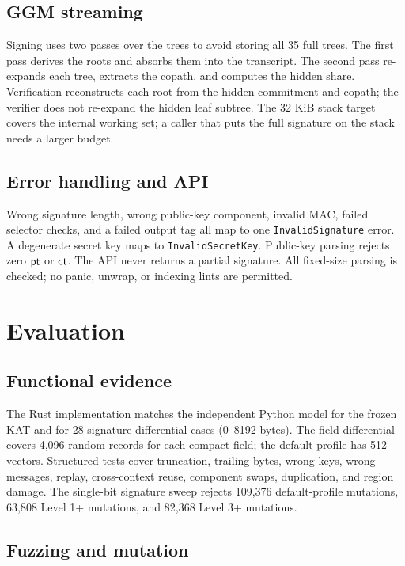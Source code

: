 \documentclass[11pt,a4paper]{article}
\begin{document}
\subsection{GGM streaming}

Signing uses two passes over the trees to avoid storing all 35 full trees. The
first pass derives the roots and absorbs them into the transcript. The second
pass re-expands each tree, extracts the copath, and computes the hidden share.
Verification reconstructs each root from the hidden commitment and copath; the
verifier does not re-expand the hidden leaf subtree. The 32 KiB stack target
covers the internal working set; a caller that puts the full signature on the
stack needs a larger budget.

\subsection{Error handling and API}

Wrong signature length, wrong public-key component, invalid MAC, failed
selector checks, and a failed output tag all map to one \texttt{InvalidSignature}
error. A degenerate secret key maps to \texttt{InvalidSecretKey}. Public-key
parsing rejects zero $\mathsf{pt}$ or $\mathsf{ct}$. The API never returns a partial
signature. All fixed-size parsing is checked; no panic, unwrap, or indexing
lints are permitted.

\section{Evaluation}
\label{sec:evaluation}

\subsection{Functional evidence}

The Rust implementation matches the independent Python model for the frozen
KAT and for 28 signature differential cases (0--8192 bytes). The field
differential covers 4,096 random records for each compact field; the default
profile has 512 vectors. Structured tests cover truncation, trailing bytes,
wrong keys, wrong messages, replay, cross-context reuse, component swaps,
duplication, and region damage. The single-bit signature sweep rejects
109,376 default-profile mutations, 63,808 Level 1+ mutations, and 82,368
Level 3+ mutations.

\subsection{Fuzzing and mutation}
\end{document}
